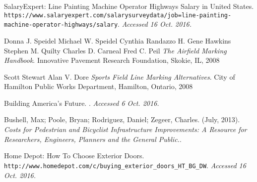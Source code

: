 \begin{thebibliography}

SalaryExpert: Line Painting Machine Operator Highways Salary in United States.
\texttt{https://www.salaryexpert.com/salarysurveydata/job=line-painting-machine-operator-highways/salary}.
\textit{Accessed 16 Oct. 2016.}

Donna J. Speidel
Michael W. Speidel
Cynthia Randazzo
H. Gene Hawkins
Stephen M. Quilty
Charles D. Carneal
Fred C. Peil
\textit{The Airfield Marking Handbook}.
Innovative Pavement Research Foundation, Skokie, IL, 2008

Scott Stewart
Alan V. Dore
\textit{Sports Field Line Marking Alternatives}.
City of Hamilton Public Works Department, Hamilton, Ontario, 2008

Building America's Future.
. 
\textit{Accessed 6 Oct. 2016.}
 
Bushell, Max; Poole, Bryan; Rodriguez, Daniel; Zegeer, Charles. 
(July, 2013).
\textit{Costs for Pedestrian and Bicyclist Infrastructure Improvements: A Resource for Researchers, Engineers, Planners and the General Public.}. 

Home Depot: How To Choose Exterior Doors.
\texttt{http://www.homedepot.com/c/buying_exterior_doors_HT_BG_DW}.
\textit{Accessed 16 Oct. 2016.}

\end{thebibliography}